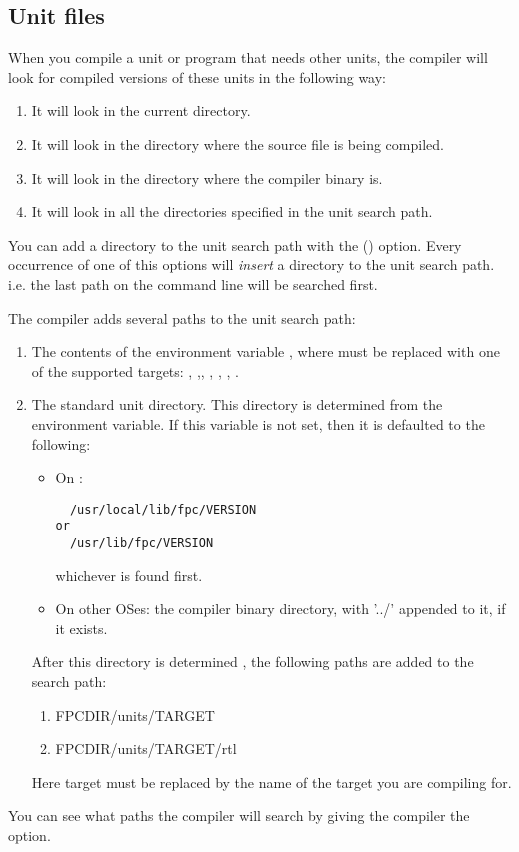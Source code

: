 \subsection{Unit files}

When you compile a unit or program that needs other units, the compiler will
look for compiled versions of these units in the following way:
\begin{enumerate}
\item It will look in the current directory.
\item It will look in the directory where the source file is being compiled.
\item It will look in the directory where the compiler binary is.
\item It will look in all the directories specified in the unit search path.
\end{enumerate}

You can add a directory to the unit search path with the ()
option. Every occurrence of one of this options will {\em insert}
a directory to the unit search path. i.e. the last path on the command line
will be searched first.

The compiler adds several paths to the unit search path:
\begin{enumerate}
\item The contents of the environment variable , where 
must be replaced with one of the supported targets: ,
,, , , , .
\item The standard unit directory. This directory is determined
from the  environment variable. If this variable is not set,
then it is defaulted to the following:
\begin{itemize}
\item On \linux:
\begin{verbatim}
  /usr/local/lib/fpc/VERSION
or
  /usr/lib/fpc/VERSION
\end{verbatim}
whichever is found first.
\item On other OSes: the compiler binary directory, with '../' appended
to it, if it exists.
\end{itemize}
After this directory is determined , the following paths are added to the
search path:
\begin{enumerate}
\item FPCDIR/units/TARGET
\item FPCDIR/units/TARGET/rtl
\end{enumerate}
Here target must be replaced by the name of the target you are compiling for.
\end{enumerate}
You can see what paths the compiler will search by giving the compiler
the  option.

